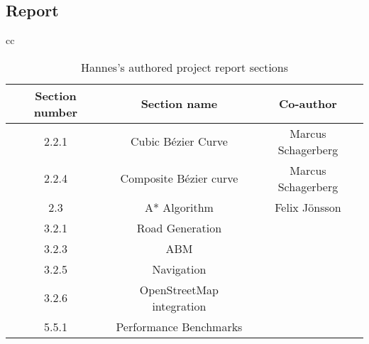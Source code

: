 \subsection{Report}
    \begin{table}[ht]
        \centering
        \begin{tabular}{cc}
            \begin{tabular}{|c|c|c|}
                \hline
                \textbf{Section number} & \textbf{Section name} & \textbf{Co-author}
                \\\hline
                2.2.1 & Cubic Bézier Curve & Marcus Schagerberg
                \\\hline
                2.2.4 & Composite Bézier curve & Marcus Schagerberg
                \\\hline
                2.3 & A* Algorithm & Felix Jönsson
                \\\hline
                3.2.1 & Road Generation & 
                \\\hline
                3.2.3 & ABM & 
                \\\hline
                3.2.5 & Navigation & 
                \\\hline
                3.2.6 & OpenStreetMap integration & 
                \\\hline
                5.5.1 & Performance Benchmarks & 

                
                \\\hline
            \end{tabular}
            
            \\
        \end{tabular}
        \caption{Hannes's authored project report sections}
        \label{Tab:jakob-authored-sections}
    \end{table}